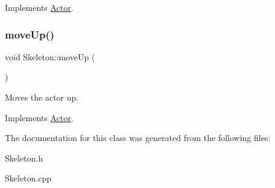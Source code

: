 Implements \mbox{\hyperlink{classActor_a9176d8f8ec68fcbd91c48223e7c65775}{Actor}}.

\mbox{\label{classSkeleton_a0ddbea7574ada0b5cef0cadbd4a0dd9f}} 
\subsubsection{\texorpdfstring{moveUp()}{moveUp()}}
{\footnotesize\ttfamily void Skeleton\+::move\+Up (\begin{DoxyParamCaption}{ }\end{DoxyParamCaption})\hspace{0.3cm}{\ttfamily [virtual]}}



Moves the actor up. 



Implements \mbox{\hyperlink{classActor_afaa299f90233461ee4df96dcfda3008a}{Actor}}.



The documentation for this class was generated from the following files\+:\begin{DoxyCompactItemize}
\item 
Skeleton.\+h\item 
Skeleton.\+cpp\end{DoxyCompactItemize}

